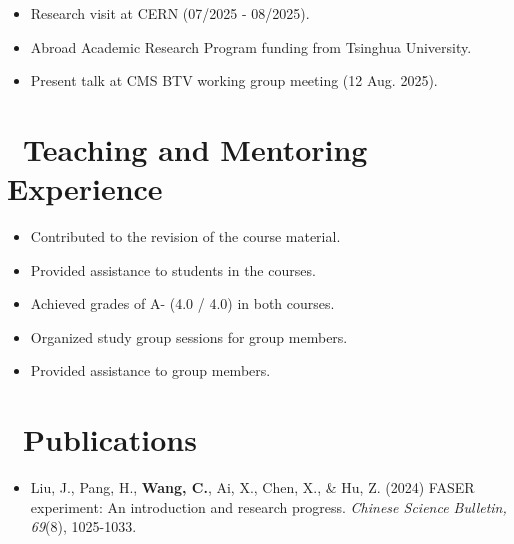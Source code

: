 \documentclass{resume}
\begin{document}
\begin {itemize}
  \item Research visit at CERN (07/2025 - 08/2025).
  \item Abroad Academic Research Program funding from Tsinghua University.
  \item Present talk at CMS BTV working group meeting (12 Aug. 2025).
\end{itemize}


\section{\faUsers\ Teaching and Mentoring Experience}
\begin {itemize}
  \item Contributed to the revision of the course material.
  \item Provided assistance to students in the courses.
  \item Achieved grades of A- (4.0 / 4.0) in both courses.
\end{itemize}
\begin {itemize}
  \item Organized study group sessions for group members.
  \item Provided assistance to group members.
\end{itemize}


\section{\faFileText\ Publications}
\begin{itemize}
  \item Liu, J., Pang, H., \textbf{Wang, C.}, Ai, X., Chen, X., \& Hu, Z. (2024) FASER experiment: An introduction and research progress. \textit{Chinese Science Bulletin, 69}(8), 1025-1033.
\end{itemize}
\end{document}
